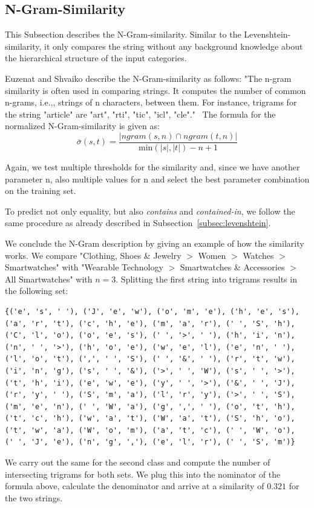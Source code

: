 \subsection{N-Gram-Similarity}
\label{subsec:ngram}

This Subsection describes the N-Gram-similarity.
Similar to the Levenshtein-similarity, it only compares the string without any background knowledge about the
hierarchical structure of the input categories.

Euzenat and Shvaiko describe the N-Gram-similarity as follows:
"The n-gram similarity is often used in comparing strings.
It computes the number of common n-grams, i.e.,, strings of n characters, between them.
For instance, trigrams for the string "article" are "art", "rti", "tic", "icl", "cle"."~\cite[p. 90]{euzenat2007ontology}
The formula for the normalized N-Gram-similarity is given as:
\begin{equation*}
    \bar{\sigma}(s, t) = \frac{|ngram(s, n) \cap ngram(t, n)|}{\mbox{min}(|s|, |t|) - n + 1}
\end{equation*}

Again, we test multiple thresholds for the similarity and, since we have another parameter n, also
multiple values for n and select the best parameter combination on the training set.

To predict not only equality, but also \emph{contains} and \emph{contained-in}, we follow the same procedure as already
described in Subsection~\ref{subsec:levenshtein}.

We conclude the N-Gram description by giving an example of how the similarity works.
We compare "Clothing, Shoes \& Jewelry $>$ Women $>$ Watches $>$ Smartwatches" with
"Wearable Technology $>$ Smartwatches \& Accessories $>$ All Smartwatches" with $n = 3$.
Splitting the first string into trigrams results in the following set:
\begin{verbatim}
{('e', 's', ' '), ('J', 'e', 'w'), ('o', 'm', 'e'), ('h', 'e', 's'),
('a', 'r', 't'), ('c', 'h', 'e'), ('m', 'a', 'r'), (' ', 'S', 'h'),
('C', 'l', 'o'), ('o', 'e', 's'), (' ', '>', ' '), ('h', 'i', 'n'),
('n', ' ', '>'), ('h', 'o', 'e'), ('w', 'e', 'l'), ('e', 'n', ' '),
('l', 'o', 't'), (',', ' ', 'S'), (' ', '&', ' '), ('r', 't', 'w'),
('i', 'n', 'g'), ('s', ' ', '&'), ('>', ' ', 'W'), ('s', ' ', '>'),
('t', 'h', 'i'), ('e', 'w', 'e'), ('y', ' ', '>'), ('&', ' ', 'J'),
('r', 'y', ' '), ('S', 'm', 'a'), ('l', 'r', 'y'), ('>', ' ', 'S'),
('m', 'e', 'n'), (' ', 'W', 'a'), ('g', ',', ' '), ('o', 't', 'h'),
('t', 'c', 'h'), ('w', 'a', 't'), ('W', 'a', 't'), ('S', 'h', 'o'),
('t', 'w', 'a'), ('W', 'o', 'm'), ('a', 't', 'c'), (' ', 'W', 'o'),
(' ', 'J', 'e'), ('n', 'g', ','), ('e', 'l', 'r'), (' ', 'S', 'm')}
\end{verbatim}
We carry out the same for the second class and compute the number of intersecting
trigrams for both sets.
We plug this into the nominator of the formula above, calculate the denominator
and arrive at a similarity of $0.321$ for the two strings.

